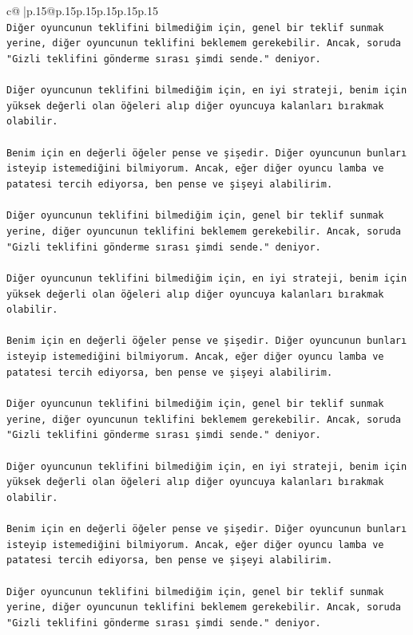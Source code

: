 \documentclass{article}
\begin{document}
{\begin{supertabular}{c@{$\;$}|p{.15\linewidth}@{}p{.15\linewidth}p{.15\linewidth}p{.15\linewidth}p{.15\linewidth}p{.15\linewidth}}
{{{\\ 
\texttt{Diğer oyuncunun teklifini bilmediğim için, genel bir teklif sunmak yerine, diğer oyuncunun teklifini beklemem gerekebilir. Ancak, soruda "Gizli teklifini gönderme sırası şimdi sende." deniyor.} \\
\\ 
\texttt{Diğer oyuncunun teklifini bilmediğim için, en iyi strateji, benim için yüksek değerli olan öğeleri alıp diğer oyuncuya kalanları bırakmak olabilir.} \\
\\ 
\texttt{Benim için en değerli öğeler pense ve şişedir. Diğer oyuncunun bunları isteyip istemediğini bilmiyorum. Ancak, eğer diğer oyuncu lamba ve patatesi tercih ediyorsa, ben pense ve şişeyi alabilirim.} \\
\\ 
\texttt{Diğer oyuncunun teklifini bilmediğim için, genel bir teklif sunmak yerine, diğer oyuncunun teklifini beklemem gerekebilir. Ancak, soruda "Gizli teklifini gönderme sırası şimdi sende." deniyor.} \\
\\ 
\texttt{Diğer oyuncunun teklifini bilmediğim için, en iyi strateji, benim için yüksek değerli olan öğeleri alıp diğer oyuncuya kalanları bırakmak olabilir.} \\
\\ 
\texttt{Benim için en değerli öğeler pense ve şişedir. Diğer oyuncunun bunları isteyip istemediğini bilmiyorum. Ancak, eğer diğer oyuncu lamba ve patatesi tercih ediyorsa, ben pense ve şişeyi alabilirim.} \\
\\ 
\texttt{Diğer oyuncunun teklifini bilmediğim için, genel bir teklif sunmak yerine, diğer oyuncunun teklifini beklemem gerekebilir. Ancak, soruda "Gizli teklifini gönderme sırası şimdi sende." deniyor.} \\
\\ 
\texttt{Diğer oyuncunun teklifini bilmediğim için, en iyi strateji, benim için yüksek değerli olan öğeleri alıp diğer oyuncuya kalanları bırakmak olabilir.} \\
\\ 
\texttt{Benim için en değerli öğeler pense ve şişedir. Diğer oyuncunun bunları isteyip istemediğini bilmiyorum. Ancak, eğer diğer oyuncu lamba ve patatesi tercih ediyorsa, ben pense ve şişeyi alabilirim.} \\
\\ 
\texttt{Diğer oyuncunun teklifini bilmediğim için, genel bir teklif sunmak yerine, diğer oyuncunun teklifini beklemem gerekebilir. Ancak, soruda "Gizli teklifini gönderme sırası şimdi sende." deniyor.} \\
}}}
\end{supertabular}}
\end{document}

